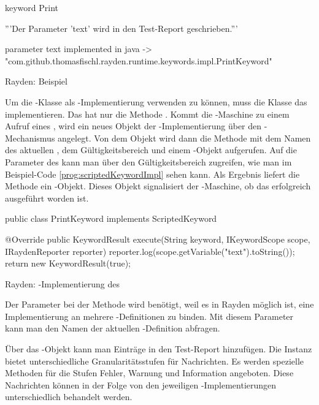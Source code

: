 \begin{program}
\begin{JavaCode}
keyword Print {
	'''Der Parameter 'text' wird in den Test-Report geschrieben.'''
	
	parameter text
	implemented in java -> "com.github.thomasfischl.rayden.runtime.keywords.impl.PrintKeyword"
}
\end{JavaCode}
\caption{Rayden: Beispiel }
\label{prog:scriptedKeyword}
\end{program}

\SuperPar
Um die -Klasse als -Implementierung verwenden zu können, muss die Klasse das   implementieren. Das  hat nur die Methode . Kommt die -Maschine zu einem Aufruf eines , wird ein neues Objekt der -Implementierung über den -Mechanismus angelegt. Von dem Objekt wird dann die Methode  mit dem Namen des aktuellen , dem Gültigkeitsbereich und einem -Objekt aufgerufen. Auf die Parameter des  kann man über den Gültigkeitsbereich zugreifen, wie man im Beispiel-Code \ref{prog:scriptedKeywordImpl} sehen kann. Als Ergebnis liefert die Methode ein -Objekt. Dieses Objekt signalisiert der -Maschine, ob das  erfolgreich ausgeführt worden ist.   

\begin{program}
\begin{JavaCode}
public class PrintKeyword implements ScriptedKeyword {

	@Override
	public KeywordResult execute(String keyword, 
			IKeywordScope scope, IRaydenReporter reporter) {
		reporter.log(scope.getVariable("text").toString());
		return new KeywordResult(true);
	}
}
\end{JavaCode}
\caption{Rayden: -Implementierung des }
\label{prog:scriptedKeywordImpl}
\end{program}

\SuperPar
Der Parameter  bei der Methode  wird benötigt, weil es in Rayden möglich ist, eine Implementierung an mehrere -Definitionen zu binden. Mit diesem Parameter kann man den Namen der aktuellen -Definition abfragen.

\SuperPar
Über das -Objekt kann man Einträge in den Test-Report hinzufügen. Die Instanz bietet unterschiedliche Granularitätsstufen für Nachrichten. Es werden spezielle Methoden für die Stufen Fehler, Warnung und Information angeboten. Diese Nachrichten können in der Folge von den jeweiligen -Implementierungen unterschiedlich behandelt werden. 

